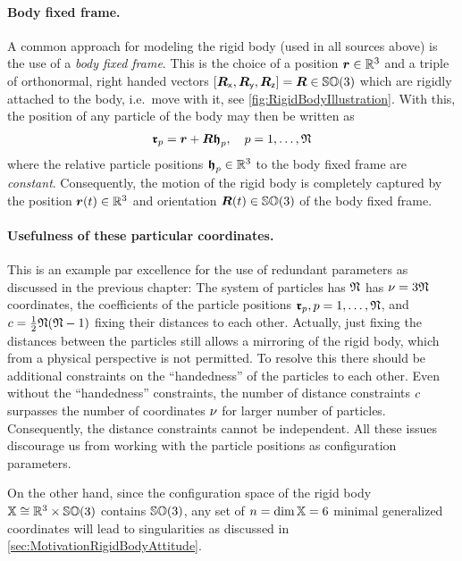 \paragraph*{Body fixed frame.}
A common approach for modeling the rigid body (used in all sources above) is the use of a \textit{body fixed frame}.
This is the choice of a position $\boldsymbol{r}\in \mathbb{R}^3$ and a triple of orthonormal, right handed vectors $[\boldsymbol{R}_{\mathsf{x}},\boldsymbol{R}_{\mathsf{y}},\boldsymbol{R}_{\mathsf{z}}] = \boldsymbol{R} \in \mathbb{SO}(3)$ which are rigidly attached to the body, i.e.\ move with it, see \autoref{fig:RigidBodyIllustration}.
With this, the position of any particle of the body may then be written as
\begin{align}\label{eq:RBParticlePos}
 \boldsymbol{\mathfrak{r}}_{p} = \boldsymbol{r} + \boldsymbol{R} \boldsymbol{\mathfrak{h}}_{p}, \quad p=1,\ldots,\mathfrak{N}
\end{align}
where the relative particle positions $\boldsymbol{\mathfrak{h}}_{p} \in \mathbb{R}^3$ to the body fixed frame are \textit{constant}.
Consequently, the motion of the rigid body is completely captured by the position $\boldsymbol{r}(t) \in \mathbb{R}^3$ and orientation $\boldsymbol{R}(t) \in \mathbb{SO}(3)$ of the body fixed frame.

\paragraph*{Usefulness of these particular coordinates.}
This is an example par excellence for the use of redundant parameters as discussed in the previous chapter:
The system of particles has $\mathfrak{N}$ has $\nu = 3\mathfrak{N}$ coordinates, the coefficients of the particle positions $\boldsymbol{\mathfrak{r}}_{p}, p=1,\ldots,\mathfrak{N}$, and $c = \tfrac{1}{2} \mathfrak{N}(\mathfrak{N}-1)$ fixing their distances to each other.
Actually, just fixing the distances between the particles still allows a mirroring of the rigid body, which from a physical perspective is not permitted. 
To resolve this there should be additional constraints on the ``handedness'' of the particles to each other.
Even without the ``handedness'' constraints, the number of distance constraints $c$ surpasses the number of coordinates $\nu$ for larger number of particles.
Consequently, the distance constraints cannot be independent.
All these issues discourage us from working with the particle positions as configuration parameters.

On the other hand, since the configuration space of the rigid body $\mathbb{X} \cong \mathbb{R}^3 \times \mathbb{SO}(3)$ contains $\mathbb{SO}(3)$, any set of $n=\dim \mathbb{X} = 6$ minimal generalized coordinates will lead to singularities as discussed in \autoref{sec:MotivationRigidBodyAttitude}.

